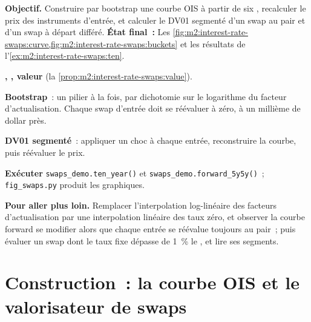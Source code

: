 \begin{tutorial}
\textbf{Objectif.} Construire par bootstrap une courbe OIS à partir de six ,
recalculer le prix des instruments d'entrée, et calculer le DV01 segmenté d'un swap au pair et d'un swap à départ différé.
\textbf{État final~:}
Les \cref{fig:m2:interest-rate-swaps:curve,fig:m2:interest-rate-swaps:buckets} et les
résultats de l'\cref{ex:m2:interest-rate-swaps:ten}.
\begin{tutsteps}
\item \textbf{, , valeur} (la \cref{prop:m2:interest-rate-swaps:value}).
\label{lst:m2:interest-rate-swaps:value}
\item \textbf{Bootstrap}~: un pilier à la fois, par dichotomie sur le logarithme
du facteur d'actualisation.
\label{lst:m2:interest-rate-swaps:bootstrap}
Chaque swap d'entrée doit se réévaluer à zéro, à un millième de dollar près.
\item \textbf{DV01 segmenté}~: appliquer un choc à chaque entrée, reconstruire la courbe, puis réévaluer le prix.
\label{lst:m2:interest-rate-swaps:buckets}
\item \textbf{Exécuter} \texttt{swaps\_demo.ten\_year()} et
\texttt{swaps\_demo.forward\_5y5y()}~; \texttt{fig\_swaps.py} produit les graphiques.
\end{tutsteps}
\textbf{Pour aller plus loin.} Remplacer l'interpolation log-linéaire des facteurs d'actualisation
par une interpolation linéaire des taux zéro, et observer la courbe forward se modifier
alors que chaque entrée se réévalue toujours au pair~; puis évaluer un swap dont le taux fixe
dépasse de 1~\% le , et lire ses segments.
\end{tutorial}

\section{Construction~: la courbe OIS et le valorisateur de swaps}\label{bld:m2:interest-rate-swaps:curve}

